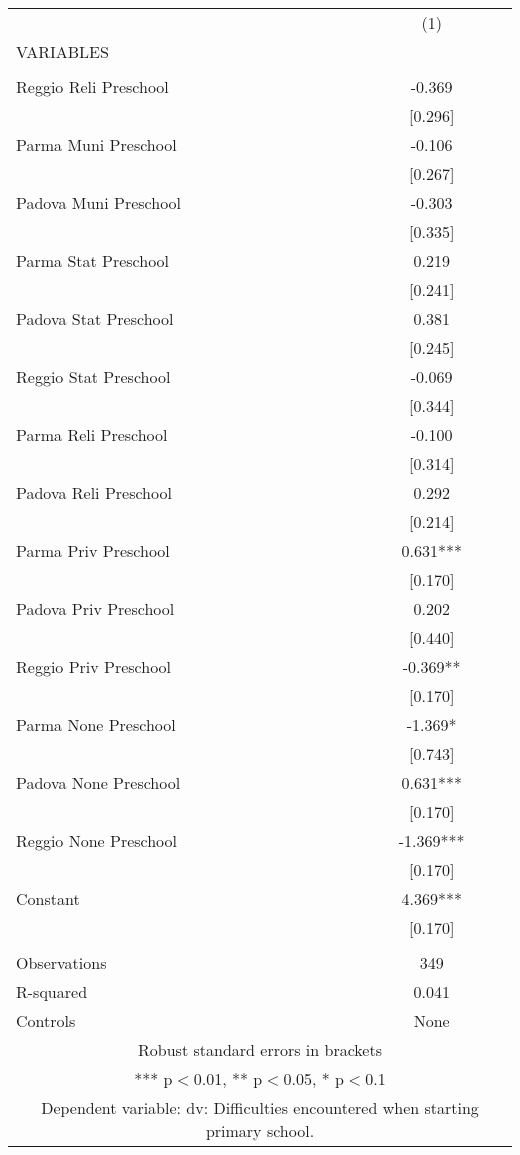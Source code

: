 \begin{tabular}{lc} \hline
 & (1) \\
VARIABLES &  \\ \hline
 &  \\
Reggio Reli Preschool & -0.369 \\
 & [0.296] \\
Parma Muni Preschool & -0.106 \\
 & [0.267] \\
Padova Muni Preschool & -0.303 \\
 & [0.335] \\
Parma Stat Preschool & 0.219 \\
 & [0.241] \\
Padova Stat Preschool & 0.381 \\
 & [0.245] \\
Reggio Stat Preschool & -0.069 \\
 & [0.344] \\
Parma Reli Preschool & -0.100 \\
 & [0.314] \\
Padova Reli Preschool & 0.292 \\
 & [0.214] \\
Parma Priv Preschool & 0.631*** \\
 & [0.170] \\
Padova Priv Preschool & 0.202 \\
 & [0.440] \\
Reggio Priv Preschool & -0.369** \\
 & [0.170] \\
Parma None Preschool & -1.369* \\
 & [0.743] \\
Padova None Preschool & 0.631*** \\
 & [0.170] \\
Reggio None Preschool & -1.369*** \\
 & [0.170] \\
Constant & 4.369*** \\
 & [0.170] \\
 &  \\
Observations & 349 \\
R-squared & 0.041 \\
 Controls & None \\ \hline
\multicolumn{2}{c}{ Robust standard errors in brackets} \\
\multicolumn{2}{c}{ *** p$<$0.01, ** p$<$0.05, * p$<$0.1} \\
\multicolumn{2}{c}{ Dependent variable: dv: Difficulties encountered when starting primary school.} \\
\end{tabular}
